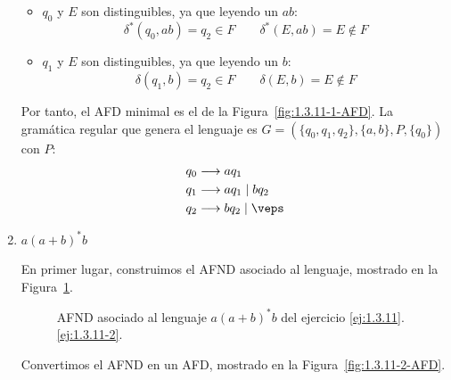 \begin{ejercicio}
\begin{enumerate}
\begin{itemize}
            \item $q_0$ y $E$ son distinguibles, ya que leyendo un $ab$:
            \begin{equation*}
                \delta^*(q_0,ab)=q_2\in F\qquad \delta^*(E,ab)=E\notin F
            \end{equation*}

            \item $q_1$ y $E$ son distinguibles, ya que leyendo un $b$:
            \begin{equation*}
                \delta(q_1,b)=q_2\in F\qquad \delta(E,b)=E\notin F
            \end{equation*}
        \end{itemize}

        Por tanto, el AFD minimal es el de la Figura~\ref{fig:1.3.11-1-AFD}. La gramática regular que genera el lenguaje es $G=(\{q_0,q_1,q_2\},\{a,b\},P,\{q_0\})$ con $P$:
        \begin{align*}
            q_0 &\longrightarrow aq_1\\
            q_1 &\longrightarrow aq_1\mid bq_2\\
            q_2 &\longrightarrow bq_2\mid \veps
        \end{align*}
        \item \label{ej:1.3.11-2}
        $a{(a+b)}^{\ast}b$
        
        En primer lugar, construimos el AFND asociado al lenguaje, mostrado en la Figura~\ref{fig:1.3.11-2-AFND}.
        \begin{figure}
            \centering
            \caption{AFND asociado al lenguaje $a{(a+b)}^{\ast}b$ del ejercicio \ref{ej:1.3.11}.\ref{ej:1.3.11-2}.}
            \label{fig:1.3.11-2-AFND}
        \end{figure}

        Convertimos el AFND en un AFD, mostrado en la Figura~\ref{fig:1.3.11-2-AFD}.
        \begin{figure}
            \centering
\end{figure}
\end{enumerate}
\end{ejercicio}
